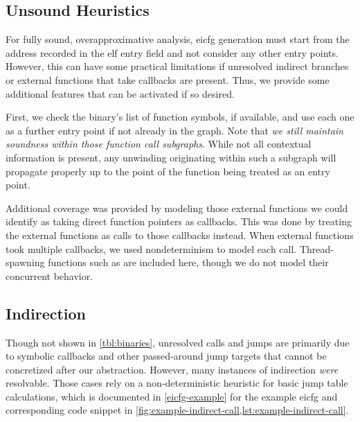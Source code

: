 \subsection{Unsound Heuristics}
\begin{comment}
  In total, we achieved an average of \coveredpercent\ coverage of the counted instructions across the \satisfactorybins\ satisfactory (\cutoffpercent\ coverage) binaries.
  Ideally, this number would be the ratio of reached instructions to actual reachable instructions.
  However, we do not have a ground truth for the latter number. Therefore, we approximate by comparing the number of reached instructions with the raw line count provided by \inlineasm{objdump}. This ratio gives an \emph{indication} of how much of each binary was covered.

  The coverage was achieved in several steps for each binary.
\end{comment}
For fully sound, overapproximative analysis, \gls{eicfg} generation must start from the address recorded in the \gls{elf} entry field and not consider any other entry points.
However, this can have some practical limitations if unresolved indirect branches or external functions that take callbacks are present.
Thus, we provide some additional features that can be activated if so desired.

First, we check the binary's list of function symbols, if available, and use each one as a further entry point if not already in the graph.
Note that \emph{we still maintain soundness within those function call subgraphs}.
While not all contextual information is present, any unwinding originating within such a subgraph will propagate properly up to the point of the function being treated as an entry point.

Additional coverage was provided by modeling those external functions we could identify as taking direct function pointers as callbacks.
This was done by treating the external functions as calls to those callbacks instead.
When external functions took multiple callbacks, we used nondeterminism to model each call.
Thread-spawning functions such as  are included here, though we do not model their concurrent behavior.

\subsection{Indirection}\label{sec:indirection}
Though not shown in \cref{tbl:binaries}, unresolved calls and jumps are primarily due to symbolic callbacks and other passed-around jump targets that cannot be concretized after our abstraction.
However, many instances of indirection \emph{were} resolvable.%
Those cases rely on a non-deterministic heuristic for basic jump table calculations, which is documented in \cref{eicfg-example} for the example \gls{eicfg} and corresponding code snippet in \cref{fig:example-indirect-call,lst:example-indirect-call}.


